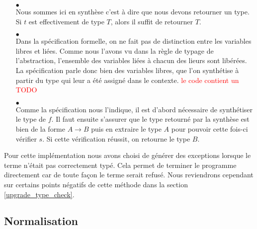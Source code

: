 \documentclass {article}
\newcommand{\codefrom}[3]
           {}
\theoremstyle{definition}
\theoremstyle{remark}
\newcommand{\todo}[1]{\textcolor{red}{#1}}
\begin{document}
\begin{itemize}
 \codefrom{typed}{lambda}{synth_def}

\item[$\bullet$]  \\

  Nous sommes ici en synthèse c'est à dire que nous devons retourner un type.
  Si $t$ est effectivement de type $T$, alors il suffit de retourner $T$.
\codefrom{typed}{lambda}{synth_ann}



\item[$\bullet$] \\

Dans la spécification formelle, on ne fait pas de distinction entre
les variables libres et liées.  Comme nous l'avons vu dans la règle de
typage de l'abstraction, l'ensemble des variables liées à chacun des
lieurs sont libérées. La spécification parle donc bien des variables
libres, que l'on synthétise à partir  du type qui leur a été assigné dans le contexte. \todo{le code contient un TODO}
%
\codefrom{typed}{lambda}{synth_var}

\item[$\bullet$] \\

  
  Comme la spécification nous l'indique, il est d'abord nécessaire de synthétiser le type de $f$.
  Il faut ensuite s'assurer que le type retourné par la synthèse est bien de la forme $A\rightarrow B$
  puis en extraire le type $A$ pour pouvoir cette fois-ci vérifier $s$. Si cette vérification réussit,
  on retourne le type $B$.
 
\codefrom{typed}{lambda}{synth_appl}

\end{itemize}

Pour cette implémentation nous avons choisi de générer des exceptions
lorsque le terme n'était pas correctement typé. Cela permet de
terminer le programme directement car de toute façon le terme serait
refusé. Nous reviendrons cependant sur certains points négatifs de
cette méthode dans la section \ref{upgrade_type_check}.



\subsection{Normalisation} 
\end{document}

